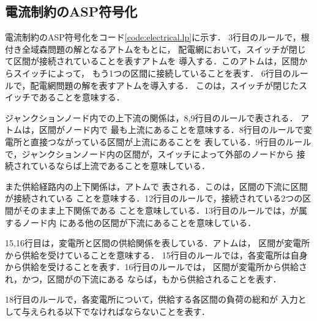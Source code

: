 \subsection{電流制約のASP符号化}



電流制約のASP符号化をコード\ref{code:electrical.lp}に示す．
3行目のルールで，根付き全域森問題の解となるアトムをもとに，
配電網において，スイッチが閉じて区間が接続されていることを表すアトムを
導入する．このアトムは，区間からスイッチによって，
もう1つの区間に接続していることを表す．
6行目のルールで，配電網問題の解を表すアトムを導入する．
このは，スイッチが閉じたスイッチであることを意味する．

ジャンクションノード内での上下流の関係は，8,9行目のルールで表される．
アトムは，区間がノード内で
最も上流にあることを意味する．8行目のルールで変電所と直接つながっている区間が上流にあることを
表している．9行目のルールで，ジャンクションノード内の区間が，スイッチによって外部のノードから
接続されているならば上流であることを意味している．

また供給経路内の上下関係は，アトムで
表される．このは，区間の下流に区間が接続されている
ことを意味する．12行目のルールで，接続されている2つの区間がそのまま上下関係である
ことを意味している．13行目のルールでは，が属するノード内
にある他の区間が下流にあることを意味している．

15,16行目は，変電所と区間の供給関係を表している．アトムは，
区間が変電所から供給を受けていることを意味する．
15行目のルールでは，各変電所は自身から供給を受けることを表す．16行目のルールでは，
区間が変電所から供給され，かつ，区間がの下流にある
ならば，もから供給されることを表す．

18行目のルールで，各変電所について，供給する各区間の負荷の総和が
入力として与えられる以下でなければならないことを表す．

